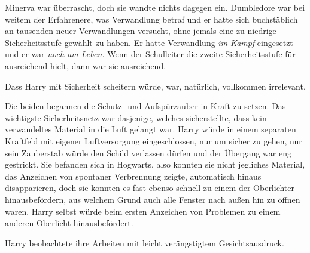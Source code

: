 Minerva war überrascht, doch sie wandte nichts dagegen ein. Dumbledore war bei weitem der Erfahrenere, was Verwandlung betraf und er hatte sich buchstäblich an tausenden neuer Verwandlungen versucht, ohne jemals eine zu niedrige Sicherheitsstufe gewählt zu haben. Er hatte Verwandlung \emph{im Kampf} eingesetzt und er war \emph{noch am Leben.} Wenn der Schulleiter die zweite Sicherheitsstufe für ausreichend hielt, dann war sie ausreichend.

Dass Harry mit Sicherheit scheitern würde, war, natürlich, vollkommen irrelevant.

Die beiden begannen die Schutz- und Aufspürzauber in Kraft zu setzen. Das wichtigste Sicherheitsnetz war dasjenige, welches sicherstellte, dass kein verwandeltes Material in die Luft gelangt war. Harry würde in einem separaten Kraftfeld mit eigener Luftversorgung eingeschlossen, nur um sicher zu gehen, nur sein Zauberstab würde den Schild verlassen dürfen und der Übergang war eng gestrickt. Sie befanden sich in Hogwarts, also konnten sie nicht jegliches Material, das Anzeichen von spontaner Verbrennung zeigte, automatisch hinaus disapparieren, doch sie konnten es fast ebenso schnell zu einem der Oberlichter hinausbefördern, aus welchem Grund auch alle Fenster nach außen hin zu öffnen waren. Harry selbst würde beim ersten Anzeichen von Problemen zu einem anderen Oberlicht hinausbefördert.

Harry beobachtete ihre Arbeiten mit leicht verängstigtem Gesichtsausdruck.

